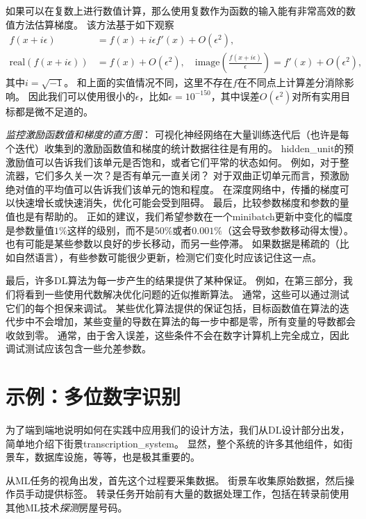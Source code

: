 如果可以在复数上进行数值计算，那么使用复数作为函数的输入能有非常高效的数值方法估算梯度\citep{Squire+Trapp-1998}。
该方法基于如下观察
\begin{align}
	f(x + i\epsilon) &= f(x) + i\epsilon f'(x) + O(\epsilon^2) ,\\
	\text{real}( f(x+i\epsilon) ) &= f(x) + O(\epsilon^2), \quad \text{image}( \frac{f(x+i\epsilon)}{ \epsilon } ) = f'(x) + O(\epsilon^2),
\end{align}
其中$i=\sqrt{-1}$。
和上面的实值情况不同，这里不存在$f$在不同点上计算差分消除影响。
因此我们可以使用很小的$\epsilon$，比如$\epsilon = 10^{-150}$，其中误差$O(\epsilon^2)$对所有实用目标都是微不足道的。


\emph{监控激励函数值和梯度的直方图}：
可视化神经网络在大量训练迭代后（也许是每个迭代）收集到的激励函数值和梯度的统计数据往往是有用的。
\gls{hidden_unit}的预激励值可以告诉我们该单元是否饱和，或者它们平常的状态如何。
例如，对于整流器，它们多久关一次？是否有单元一直关闭？
对于双曲正切单元而言，预激励绝对值的平均值可以告诉我们该单元的饱和程度。
在深度网络中，传播的梯度可以快速增长或快速消失，优化可能会受到阻碍。
最后，比较参数梯度和参数的量值也是有帮助的。
正如\citep{Bottou-DLSS2015}的建议，我们希望参数在一个\gls{minibatch}更新中变化的幅度是参数量值$1\%$这样的级别，而不是$50\%$或者$0.001\%$（这会导致参数移动得太慢）。
也有可能是某些参数以良好的步长移动，而另一些停滞。
如果数据是稀疏的（比如自然语言），有些参数可能很少更新，检测它们变化时应该记住这一点。


最后，许多\gls{DL}算法为每一步产生的结果提供了某种保证。
例如，在第三部分，我们将看到一些使用代数解决优化问题的近似推断算法。
通常，这些可以通过测试它们的每个担保来调试。
某些优化算法提供的保证包括，目标函数值在算法的迭代步中不会增加，某些变量的导数在算法的每一步中都是零，所有变量的导数都会收敛到零。
通常，由于舍入误差，这些条件不会在数字计算机上完全成立，因此调试测试应该包含一些允差参数。

\section{示例：多位数字识别}
\label{sec:example_multi_digit_number_recognition}
为了端到端地说明如何在实践中应用我们的设计方法，我们从\gls{DL}设计部分出发，简单地介绍下街景\gls{transcription_system}。
显然，整个系统的许多其他组件，如街景车，数据库设施，等等，也是极其重要的。

从\gls{ML}任务的视角出发，首先这个过程要采集数据。
街景车收集原始数据，然后操作员手动提供标签。
转录任务开始前有大量的数据处理工作，包括在转录前使用其他\gls{ML}技术\emph{探测}房屋号码。

